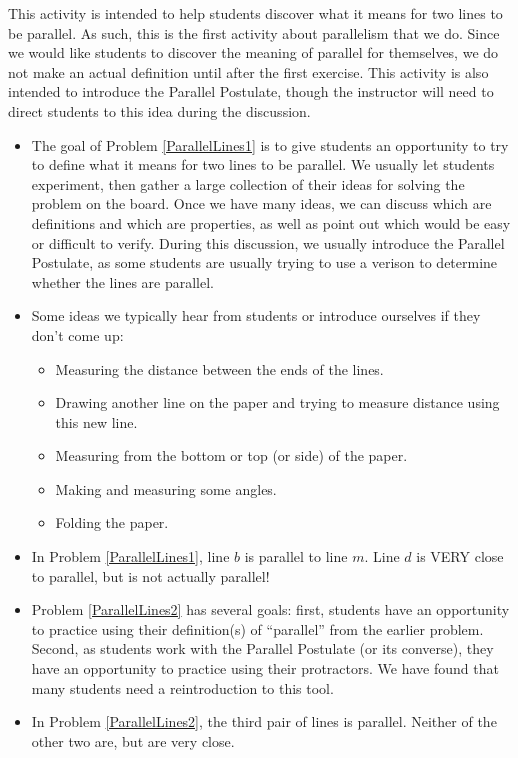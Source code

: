 \documentclass{ximera}
\begin{document}
\newpage

\begin{instructorNotes}
This activity is intended to help students discover what it means for two lines to be parallel.  As such, this is the first activity about parallelism that we do.  Since we would like students to discover the meaning of parallel for themselves, we do not make an actual definition until after the first exercise.  This activity is also intended to introduce the Parallel Postulate, though the instructor will need to direct students to this idea during the discussion.  

\begin{itemize}
    \item The goal of Problem \ref{ParallelLines1} is to give students an opportunity to try to define what it means for two lines to be parallel.  We usually let students experiment, then gather a large collection of their ideas for solving the problem on the board.  Once we have many ideas, we can discuss which are definitions and which are properties, as well as point out which would be easy or difficult to verify.  During this discussion, we usually introduce the Parallel Postulate, as some students are usually trying to use a verison to determine whether the lines are parallel.
    \item Some ideas we typically hear from students or introduce ourselves if they don't come up: 
        \begin{itemize}
            \item Measuring the distance between the ends of the lines.
            \item Drawing another line on the paper and trying to measure distance using this new line.
            \item Measuring from the bottom or top (or side) of the paper.
            \item Making and measuring some angles. 
            \item Folding the paper.
        \end{itemize}
    \item In Problem \ref{ParallelLines1}, line $b$ is parallel to line $m$.  Line $d$ is VERY close to parallel, but is not actually parallel!

\item Problem \ref{ParallelLines2} has several goals: first, students have an opportunity to practice using their definition(s) of ``parallel'' from the earlier problem.  Second, as students work with the Parallel Postulate (or its converse), they have an opportunity to practice using their protractors.  We have found that many students need a reintroduction to this tool.
\item In Problem \ref{ParallelLines2}, the third pair of lines is parallel.  Neither of the other two are, but are very close.
\end{itemize}




\end{instructorNotes}
\end{document}
